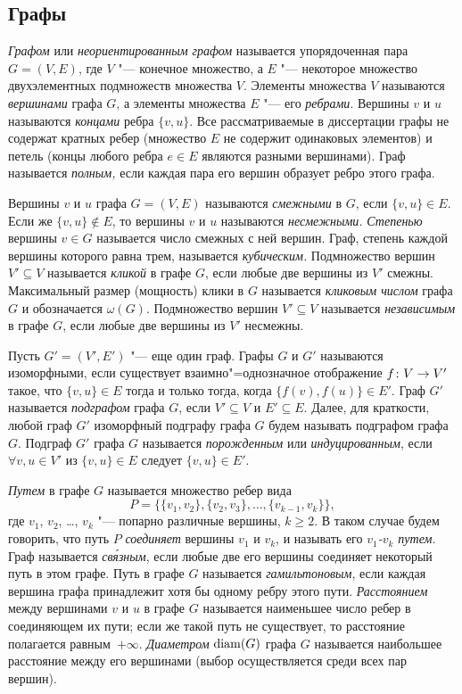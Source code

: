 \subsection{Графы}
\emph{Графом} или \emph{неориентированным графом} называется упорядоченная пара $G = (V, E)$,
где $V$ "--- конечное множество, а $E$ "--- некоторое множество двухэлементных подмножеств множества $V$.
Элементы множества $V$ называются \emph{вершинами} графа $G$, а элементы множества $E$ "--- его \emph{ребрами}.
Вершины $v$ и $u$ называются \emph{концами} ребра $\{v,u\}$.
Все рассматриваемые в диссертации графы не содержат кратных ребер (множество $E$ не содержит одинаковых элементов) и петель (концы любого ребра $e \in E$ являются разными вершинами).
Граф называется \emph{полным,} если каждая пара его вершин образует ребро этого графа.

Вершины $v$ и $u$ графа $G = (V,E)$ называются \emph{смежными} в $G$, если $\{v,u\} \in E$.
Если же $\{v,u\} \notin E$, то вершины $v$ и $u$ называются \emph{несмежными.}
\emph{Степенью} вершины $v \in G$ называется число смежных с ней вершин.
Граф, степень каждой вершины которого равна трем, называется \emph{кубическим.}
Подмножество вершин $V' \subseteq V$ называется \emph{кликой} в графе $G$, если любые две вершины из $V'$ смежны.
Максимальный размер (мощность) клики в $G$ называется \emph{кликовым числом} графа $G$ и обозначается $\omega(G)$.
Подмножество вершин $V' \subseteq V$ называется \emph{независимым} в графе $G$, если любые две вершины из $V'$ несмежны.

Пусть $G' = (V', E')$ "--- еще один граф.
Графы $G$ и $G'$ называются изоморфными, если существует взаимно"=однозначное отображение $f \colon V \to V'$ такое,
что $\{v, u\} \in E$ тогда и только тогда, когда $\{f(v), f(u)\} \in E'$.
Граф $G'$ называется \emph{подграфом} графа $G$, если $V' \subseteq V$ и $E' \subseteq E$.
Далее, для краткости, любой граф $G'$ изоморфный подграфу графа $G$ будем называть подграфом графа $G$.
Подграф $G'$ графа $G$ называется \emph{порожденным} или \emph{индуцированным}, если $\forall v, u \in V'$ из $\{v, u\} \in E$ следует $\{v, u\} \in E'$.

\emph{Путем} в графе $G$ называется множество ребер вида 
\[P = \{\{v_1, v_2\}, \{v_2, v_3\}, \dots, \{v_{k-1}, v_k\}\},
\] 
где $v_1$, $v_2$, \dots, $v_k$ "--- попарно различные вершины, $k \ge 2$.
В таком случае будем говорить, что путь $P$ \emph{соединяет} вершины $v_1$ и $v_k$, и называть его \emph{$v_1$-$v_k$ путем}.
Граф называется \emph{св\'{я}зным}, если любые две его вершины соединяет некоторый путь в этом графе.
Путь в графе $G$ называется \emph{гамильтоновым}, если каждая вершина графа принадлежит хотя бы одному ребру этого пути.
\emph{Расстоянием} между вершинами $v$ и $u$ в графе $G$ называется наименьшее число ребер в соединяющем их пути;
если же такой путь не существует, то расстояние полагается равным~$+\infty$.
\emph{Диаметром} $\operatorname{diam}(G)$ графа $G$ называется наибольшее расстояние между его вершинами (выбор осуществляется среди всех пар вершин).

